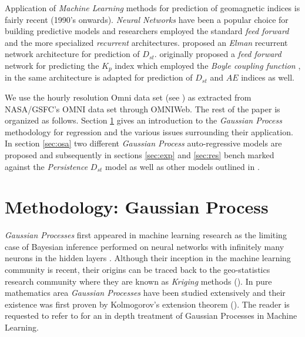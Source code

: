 \documentclass[referee,a4paper,12pt,traditabstract]{swsc}
\begin{document}
\begin{linenumbers}
Application of \emph{Machine Learning} methods for prediction of geomagnetic indices is fairly recent (1990's onwards). \emph{Neural Networks} have been a popular choice for building predictive models and researchers employed the standard \emph{feed forward} and the more specialized \emph{recurrent} architectures. \citet{Lund} proposed an \emph{Elman} recurrent network architecture for prediction of $D_{st}$. \citet{SWE:SWE286} originally proposed a \emph{feed forward} network for predicting the $K_p$ index which employed the \emph{Boyle coupling function} \citet{boyle1997empirical}, in \citet{SWE:SWE286} the same architecture is adapted for prediction of $D_{st}$ and $AE$ indices as well.




We use the hourly resolution Omni data set (see \cite{OmniPaper}) as extracted from NASA/GSFC's OMNI data set through OMNIWeb. The rest of the paper is organized as follows. Section \ref{sec:method} gives an introduction to the \emph{Gaussian Process} methodology for regression and the various issues surrounding their application. In section \ref{sec:osa} two different \emph{Gaussian Process} auto-regressive models are proposed and subsequently in sections \ref{sec:exp} and \ref{sec:res} bench marked against the \emph{Persistence} $D_{st}$ model as well as other models outlined in \citet{Ji2012}.

  
\section{Methodology: Gaussian Process} \label{sec:method}

\emph{Gaussian Processes} first appeared in machine learning research as the limiting case of Bayesian inference performed on neural networks with infinitely many neurons in the hidden layers \citet{Neal:1996:BLN:525544}. Although their inception in the machine learning community is recent, their origins can be traced back to the geo-statistics research community where they are known as \emph{Kriging} methods (\citet{krige1951statistical}). In pure mathematics area \emph{Gaussian Processes} have been studied extensively and their existence was first proven by Kolmogorov's extension theorem (\citet{tao2011introduction}). The reader is requested to refer to \cite{Rasmussen:2005:GPM:1162254} for an in depth treatment of Gaussian Processes in Machine Learning.



\end{linenumbers}
\end{document}
